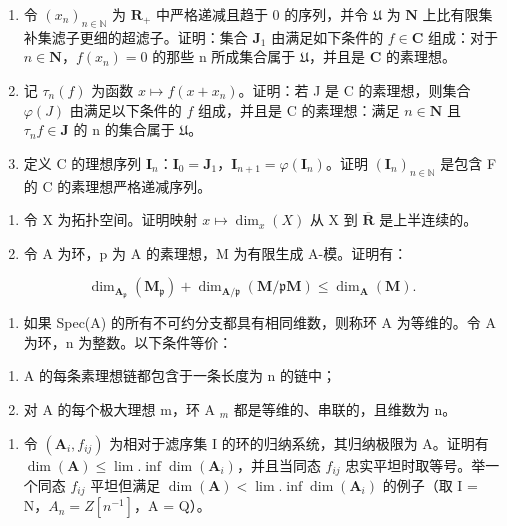 \begin{enumerate}
\def\labelenumi{\alph{enumi})}
\item
  令 \((x_{n})_{n\in \mathbb{N}}\) 为 \(\mathbf{R}_{+}\) 中严格递减且趋于 0 的序列，并令 \(\mathfrak{U}\) 为 \(\mathbf{N}\) 上比有限集补集滤子更细的超滤子。证明：集合 \(\mathbf{J}_1\) 由满足如下条件的 \(f\in \mathbf{C}\) 组成：对于 \(n\in \mathbf{N}\)，\(f(x_{n}) = 0\) 的那些 n 所成集合属于 \(\mathfrak{U}\)，并且是 \(\mathbf{C}\) 的素理想。
\item
  记 \(\tau_{n}(f)\) 为函数 \(x\mapsto f(x + x_{n})\)。证明：若 J 是 C 的素理想，则集合 \(\varphi(J)\) 由满足以下条件的 \(f\) 组成，并且是 C 的素理想：满足 \(n\in\mathbf{N}\) 且 \(\tau_{n}f\in\mathbf{J}\) 的 n 的集合属于 \(\mathfrak{U}\)。
\item
  定义 C 的理想序列 \(\mathbf{I}_n\)：\(\mathbf{I}_0 = \mathbf{J}_1\)，\(\mathbf{I}_{n+1} = \varphi(\mathbf{I}_n)\)。证明 \((\mathbf{I}_n)_{n\in\mathbb{N}}\) 是包含 F 的 C 的素理想严格递减序列。
\end{enumerate}

\begin{enumerate}
\def\labelenumi{\arabic{enumi})}
\setcounter{enumi}{7}
\item
  令 X 为拓扑空间。证明映射 \(x \mapsto \dim_x(X)\) 从 X 到 \(\overline{\mathbf{R}}\) 是上半连续的。
\item
  令 A 为环，p 为 A 的素理想，M 为有限生成 A-模。证明有：
\end{enumerate}

\[
\dim_ {\mathbf {A} _ {\mathfrak {p}}} (\mathbf {M} _ {\mathfrak {p}}) + \dim_ {\mathbf {A} / \mathfrak {p}} (\mathbf {M} / \mathfrak {p} \mathbf {M}) \leqslant \dim_ {\mathbf {A}} (\mathbf {M}).
\]

\begin{enumerate}
\def\labelenumi{\arabic{enumi})}
\setcounter{enumi}{9}
\tightlist
\item
  如果 Spec(A) 的所有不可约分支都具有相同维数，则称环 A 为等维的。令 A 为环，n 为整数。以下条件等价：
\end{enumerate}

\begin{enumerate}
\def\labelenumi{\alph{enumi})}
\tightlist
\item
  A 的每条素理想链都包含于一条长度为 n 的链中；
\item
  对 A 的每个极大理想 m，环 A \(_{m}\) 都是等维的、串联的，且维数为 n。
\end{enumerate}

\begin{enumerate}
\def\labelenumi{\arabic{enumi})}
\setcounter{enumi}{10}
\tightlist
\item
  令 \((\mathbf{A}_{i}, f_{ij})\) 为相对于滤序集 I 的环的归纳系统，其归纳极限为 A。证明有 \(\dim(\mathbf{A}) \leqslant \lim.\inf\dim(\mathbf{A}_{i})\)，并且当同态 \(f_{ij}\) 忠实平坦时取等号。举一个同态 \(f_{ij}\) 平坦但满足 \(\dim(\mathbf{A}) < \lim.\inf\dim(\mathbf{A}_{i})\) 的例子（取 I = N，\(A_{n} = Z[n^{-1}]\)，A = Q）。
\end{enumerate}


